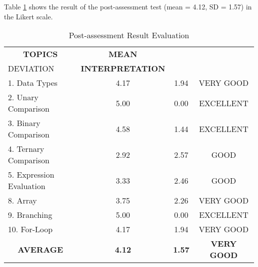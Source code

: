 \parx
Table \ref{table:post_result_scale} shows the result of the post-assessment test
(mean = 4.12, SD = 1.57) in the Likert scale.

\begin{longtable}[c]{lccc}
\caption{Post-assessment Result Evaluation}
\label{table:post_result_scale}\\ \hline
\multicolumn{1}{c}{\textbf{TOPICS}}  & \textbf{MEAN} & \textbf{\begin{tabular}[c]{@{}c@{}}STANDARD\\ DEVIATION\end{tabular}} & \textbf{INTERPRETATION} \\ \hline
\endfirsthead
%
\endhead
%
1. Data Types                        & 4.17          & 1.94                                                                  & VERY GOOD               \\
2. Unary Comparison                  & 5.00          & 0.00                                                                  & EXCELLENT               \\
3. Binary Comparison                 & 4.58          & 1.44                                                                  & EXCELLENT               \\
4. Ternary Comparison                & 2.92          & 2.57                                                                  & GOOD                    \\
5. Expression Evaluation             & 3.33          & 2.46                                                                  & GOOD                    \\
8. Array                             & 3.75          & 2.26                                                                  & VERY GOOD               \\
9. Branching                         & 5.00          & 0.00                                                                  & EXCELLENT               \\
10. For-Loop                         & 4.17          & 1.94                                                                  & VERY GOOD               \\
\multicolumn{1}{c}{\textbf{AVERAGE}} & \textbf{4.12} & \textbf{1.57}                                                         & \textbf{VERY GOOD}     \\ \hline
\end{longtable}
